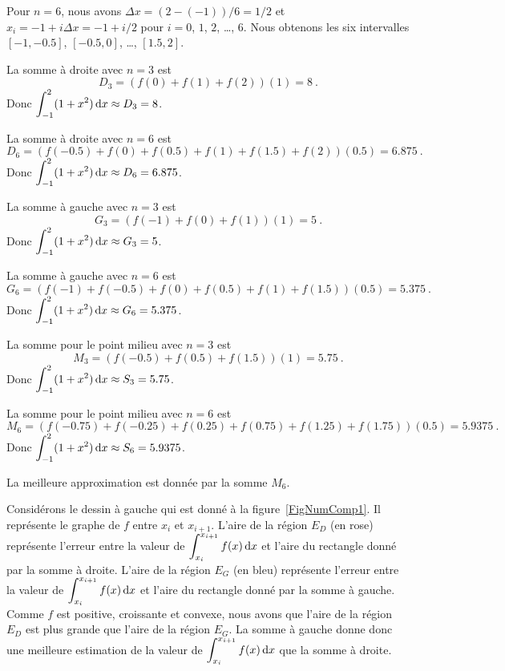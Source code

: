 {\begin{egg}
Pour $n=6$, nous avons $\Delta x = (2-(-1))/6=1/2$ et
$x_i = -1 + i \Delta x = -1+i/2$ pour $i=0$, $1$, $2$, \ldots, $6$.
Nous obtenons les six intervalles $[-1, -0.5]$, $[-0.5, 0]$, \ldots,
$[1.5, 2]$.

La somme à droite avec $n=3$ est
\[
D_3 = ( f(0) + f(1) + f(2) ) (1) = 8 \ .
\]
Donc $\displaystyle \int_{-1}^2 (1+x^2) \,\mathrm{d}x \approx D_3 = 8$.

La somme à droite avec $n=6$ est
\[
D_6 = ( f(-0.5) + f(0) + f(0.5) + f(1) + f(1.5) + f(2) ) (0.5) = 6.875 \ .
\]
Donc $\displaystyle \int_{-1}^2 (1+x^2) \,\mathrm{d}x \approx D_6 = 6.875$.

La somme à gauche avec $n=3$ est
\[
G_3 = ( f(-1) + f(0) + f(1) ) (1) = 5 \ .
\]
Donc $\displaystyle \int_{-1}^2 (1+x^2) \,\mathrm{d}x \approx G_3 = 5$.

La somme à gauche avec $n=6$ est
\[
G_6 = ( f(-1) + f(-0.5) + f(0) + f(0.5) + f(1) + f(1.5) )(0.5) = 5.375 \ .
\]
Donc $\displaystyle \int_{-1}^2 (1+x^2) \,\mathrm{d}x \approx G_6 = 5.375$.

La somme pour le point milieu avec $n=3$ est
\[
M_3 = ( f(-0.5) + f(0.5) + f(1.5) ) (1)= 5.75 \ .
\]
Donc $\displaystyle \int_{-1}^2 (1+x^2) \,\mathrm{d}x \approx S_3 = 5.75$.

La somme pour le point milieu avec $n=6$ est
\[
M_6 = ( f(-0.75) + f(-0.25) + f(0.25) + f(0.75) + f(1.25) + f(1.75) )(0.5)
= 5.9375 \ .
\]
Donc $\displaystyle \int_{-1}^2 (1+x^2) \,\mathrm{d}x \approx S_6 = 5.9375$.

La meilleure approximation est donnée par la somme $M_6$.


Considérons le dessin à gauche qui est donné à la
figure~\ref{FigNumComp1}.  Il représente le graphe de $f$ entre $x_i$
et $x_{i+1}$.  L'aire de la région $E_D$ (en rose) représente l'erreur
entre la valeur de $\displaystyle \int_{x_i}^{x_{i+1}} f(x) \,\mathrm{d}x$ et
l'aire du rectangle donné par la somme à droite.  L'aire de la région
$E_G$ (en bleu) représente l'erreur entre la valeur de
$\displaystyle \int_{x_i}^{x_{i+1}} f(x) \,\mathrm{d}x$ et l'aire du
rectangle donné par la somme à gauche.  Comme $f$ est positive,
croissante et convexe, nous avons que l'aire de la région $E_D$ est plus
grande que l'aire de la région $E_G$.  La somme à gauche donne donc
une meilleure estimation de la valeur de
$\displaystyle \int_{x_i}^{x_{i+1}} f(x) \,\mathrm{d}x$ que la somme à droite.


\end{egg}}
